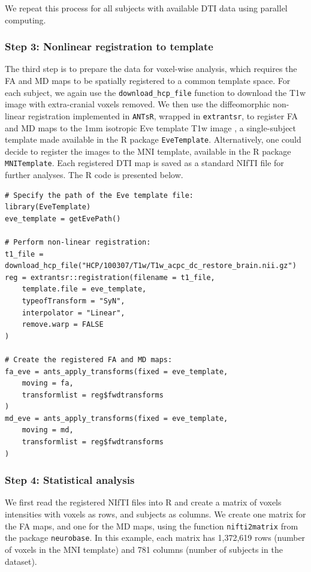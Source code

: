 \documentclass[]{elsarticle} %
\begin{document}
We repeat this process for all subjects with available DTI data using parallel computing.

\subsubsection{Step 3: Nonlinear registration to template} 
The third step is to prepare the data for voxel-wise analysis, which requires the FA and MD maps to be spatially registered to a common template space. For each subject, we again use the \texttt{download\_hcp\_file} function to download the T1w image with extra-cranial voxels removed. We then use the diffeomorphic non-linear registration implemented in \texttt{ANTsR}, wrapped in \texttt{extrantsr}, to register FA and MD maps to the 1mm isotropic Eve template T1w image \citep{eve}, a single-subject template made available in the R package \texttt{EveTemplate}. Alternatively, one could decide to register the images to the MNI template, available in the R package \texttt{MNITemplate}.   Each registered DTI map is saved as a standard NIfTI file for further analyses. The R code is presented below.

\color{blue}
\begin{verbatim}
# Specify the path of the Eve template file:
library(EveTemplate)
eve_template = getEvePath()

# Perform non-linear registration:
t1_file = download_hcp_file("HCP/100307/T1w/T1w_acpc_dc_restore_brain.nii.gz")
reg = extrantsr::registration(filename = t1_file, 
    template.file = eve_template,	
    typeofTransform = "SyN", 
    interpolator = "Linear",
    remove.warp = FALSE
)

# Create the registered FA and MD maps:
fa_eve = ants_apply_transforms(fixed = eve_template,
    moving = fa,
    transformlist = reg$fwdtransforms
)
md_eve = ants_apply_transforms(fixed = eve_template,
    moving = md,
    transformlist = reg$fwdtransforms
)    
\end{verbatim}
\color{black}

\subsubsection{Step 4: Statistical analysis} 

We first read the registered NIfTI files into R and create a matrix of voxels intensities with voxels as rows, and subjects as columns. We create one matrix for the FA maps, and one for the MD maps, using the  function \texttt{nifti2matrix} from the package \texttt{neurobase}. In this example, each matrix has 1,372,619 rows (number of voxels in the MNI template) and 781 columns (number of subjects in the dataset). 
\end{document}
